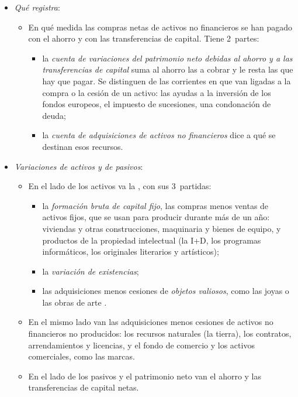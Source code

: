 \documentclass[11pt]{article}
\begin{document}
\begin{itemize}
\item \emph{Qué registra}:
  \begin{itemize}
  \item En qué medida las compras netas de activos no financieros se han pagado con el ahorro y con las transferencias de capital. Tiene 2~partes:
    \begin{itemize}
    \item la \emph{cuenta de variaciones del patrimonio neto debidas al ahorro y a las transferencias de capital} suma al ahorro las  a cobrar y le resta las que hay que pagar. Se distinguen de las corrientes en que van ligadas a la compra o la cesión de un activo: las ayudas a la inversión de los fondos europeos, el impuesto de sucesiones, una condonación de deuda;
    \item la \emph{cuenta de adquisiciones de activos no financieros} dice a qué se destinan esos recursos.
    \end{itemize}
  \end{itemize}
\item \emph{Variaciones de activos y de pasivos}:
  \begin{itemize}
  \item En el lado de los activos va la , con sus 3~partidas:
    \begin{itemize}
    \item la \emph{formación bruta de capital fijo}, las compras menos ventas de activos fijos, que se usan para producir durante más de un año: viviendas y otras construcciones, maquinaria y bienes de equipo, y productos de la propiedad intelectual (la I+D, los programas informáticos, los originales literarios y artísticos);
    \item la \emph{variación de existencias};
    \item las adquisiciones menos cesiones de \emph{objetos valiosos}, como las joyas o las obras de arte .
    \end{itemize}
  \item En el mismo lado van las adquisiciones menos cesiones de activos no financieros no producidos: los recursos naturales (la tierra), los contratos, arrendamientos y licencias, y el fondo de comercio y los activos comerciales, como las marcas.
  \item En el lado de los pasivos y el patrimonio neto van el ahorro y las transferencias de capital netas.
  \end{itemize}

\end{itemize}
\end{document}
